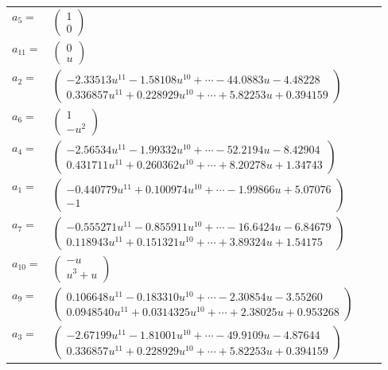 \documentclass[1p]{elsarticle_modified}
\theoremstyle{definition}
\begin{document}
\begin{tabular}{m{7pt} m{180pt} m{7pt} m{180pt} }
\flushright $a_{5}=$&$\begin{pmatrix}1\\0\end{pmatrix}$ \\
\flushright $a_{11}=$&$\begin{pmatrix}0\\u\end{pmatrix}$ \\
\flushright $a_{2}=$&$\begin{pmatrix}-2.33513 u^{11}-1.58108 u^{10}+\cdots-44.0883 u-4.48228\\0.336857 u^{11}+0.228929 u^{10}+\cdots+5.82253 u+0.394159\end{pmatrix}$ \\
\flushright $a_{6}=$&$\begin{pmatrix}1\\- u^2\end{pmatrix}$ \\
\flushright $a_{4}=$&$\begin{pmatrix}-2.56534 u^{11}-1.99332 u^{10}+\cdots-52.2194 u-8.42904\\0.431711 u^{11}+0.260362 u^{10}+\cdots+8.20278 u+1.34743\end{pmatrix}$ \\
\flushright $a_{1}=$&$\begin{pmatrix}-0.440779 u^{11}+0.100974 u^{10}+\cdots-1.99866 u+5.07076\\-1\end{pmatrix}$ \\
\flushright $a_{7}=$&$\begin{pmatrix}-0.555271 u^{11}-0.855911 u^{10}+\cdots-16.6424 u-6.84679\\0.118943 u^{11}+0.151321 u^{10}+\cdots+3.89324 u+1.54175\end{pmatrix}$ \\
\flushright $a_{10}=$&$\begin{pmatrix}- u\\u^3+u\end{pmatrix}$ \\
\flushright $a_{9}=$&$\begin{pmatrix}0.106648 u^{11}-0.183310 u^{10}+\cdots-2.30854 u-3.55260\\0.0948540 u^{11}+0.0314325 u^{10}+\cdots+2.38025 u+0.953268\end{pmatrix}$ \\
\flushright $a_{3}=$&$\begin{pmatrix}-2.67199 u^{11}-1.81001 u^{10}+\cdots-49.9109 u-4.87644\\0.336857 u^{11}+0.228929 u^{10}+\cdots+5.82253 u+0.394159\end{pmatrix}$ \\

\end{tabular}
\end{document}
